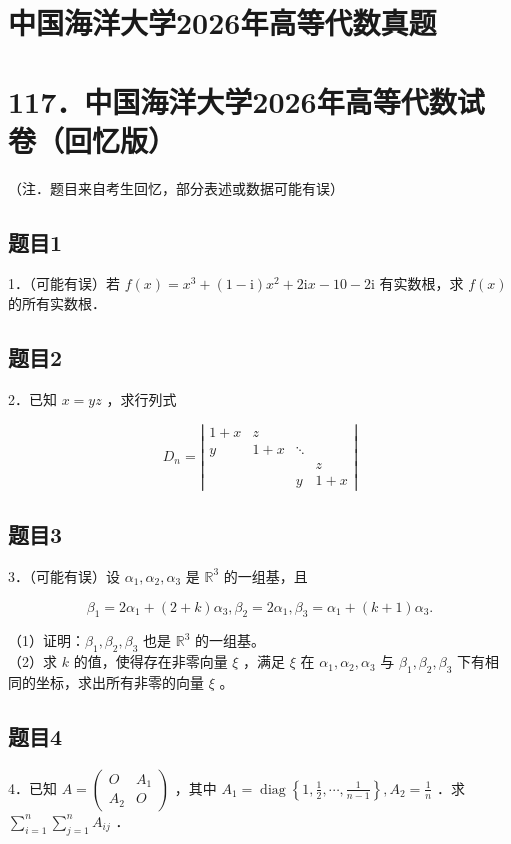 \documentclass{article}
\begin{document}
\section*{中国海洋大学2026年高等代数真题}
\section*{117．中国海洋大学2026年高等代数试卷（回忆版）}
（注．题目来自考生回忆，部分表述或数据可能有误）

\subsection{题目1}
1．（可能有误）若 \(f(x)=x^{3}+(1-\mathrm{i}) x^{2}+2 \mathrm{i} x-10-2 \mathrm{i}\) 有实数根，求 \(f(x)\) 的所有实数根．

\subsection{题目2}
2．已知 \(x=y z\) ，求行列式

\[
D_{n}=\left|\begin{array}{cccc}
1+x & z & & \\
y & 1+x & \ddots & \\
& & & z \\
& & y & 1+x
\end{array}\right|
\]

\subsection{题目3}
3．（可能有误）设 \(\alpha_{1}, \alpha_{2}, \alpha_{3}\) 是 \(\mathbb{R}^{3}\) 的一组基，且

\[
\beta_{1}=2 \alpha_{1}+(2+k) \alpha_{3}, \beta_{2}=2 \alpha_{1}, \beta_{3}=\alpha_{1}+(k+1) \alpha_{3} .
\]

（1）证明：\(\beta_{1}, \beta_{2}, \beta_{3}\) 也是 \(\mathbb{R}^{3}\) 的一组基。\\
（2）求 \(k\) 的值，使得存在非零向量 \(\xi\) ，满足 \(\xi\) 在 \(\alpha_{1}, \alpha_{2}, \alpha_{3}\) 与 \(\beta_{1}, \beta_{2}, \beta_{3}\) 下有相同的坐标，求出所有非零的向量 \(\xi\) 。

\subsection{题目4}
4．已知 \(A=\left(\begin{array}{cc}O & A_{1} \\ A_{2} & O\end{array}\right)\) ，其中 \(A_{1}=\operatorname{diag}\left\{1, \frac{1}{2}, \cdots, \frac{1}{n-1}\right\}, A_{2}=\frac{1}{n}\) ．求 \(\sum_{i=1}^{n} \sum_{j=1}^{n} A_{i j}\) ．
\end{document}
